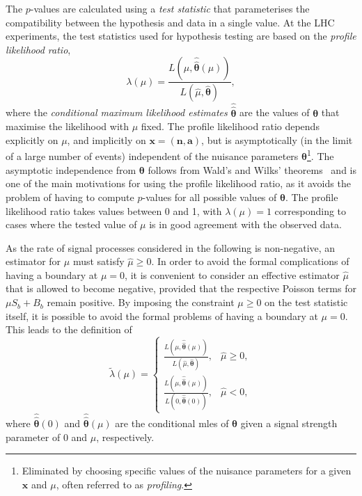 The $p$-values are calculated using a \textit{test statistic} that parameterises the compatibility between the hypothesis and data in a single value. At the LHC experiments, the test statistics used for hypothesis testing are based on the \textit{profile likelihood ratio},
\begin{equation}
	\lambda(\mu) = \frac{L(\mu,\boldsymbol{\hat{\hat{\theta}}}(\mu))}{L(\hat{\mu},\hat{\boldsymbol{\theta}})},
\end{equation}
where the \textit{conditional maximum likelihood estimates} $\boldsymbol{\hat{\hat{\theta}}}$ are the values of $\boldsymbol{\theta}$ that maximise the likelihood with $\mu$ fixed. The profile likelihood ratio depends explicitly on $\mu$, and implicitly on $\boldsymbol{x} = (\boldsymbol{n},\boldsymbol{a})$, but is asymptotically  (\ie in the limit of a large number of events) independent of the nuisance parameters $\boldsymbol{\theta}$\footnote{Eliminated by choosing specific values of the nuisance parameters for a given $\boldsymbol{x}$ and $\mu$, often referred to as \textit{profiling}.}. The asymptotic independence from $\boldsymbol{\theta}$ follows from Wald's and Wilks' theorems~\cite{wald10.2307/1990256,wilks1938} and is one of the main motivations for using the profile likelihood ratio, as it avoids the problem of having to compute $p$-values for all possible values of $\boldsymbol{\theta}$. The profile likelihood ratio takes values between 0 and 1, with $\lambda(\mu) = 1$ corresponding to cases where the tested value of $\mu$ is in good agreement with the observed data.

As the rate of signal processes considered in the following is non-negative, an estimator for $\mu$ must satisfy $\hat{\mu}\geq 0$. In order to avoid the formal complications of having a boundary at $\mu = 0$, it is convenient to consider an effective estimator $\hat{\mu}$ that is allowed to become negative, provided that the respective Poisson terms for $\mu S_b + B_b$ remain positive. By imposing the constraint $\mu \geq 0$ on the test statistic itself, it is possible to avoid the formal problems of having a boundary at $\mu = 0$. This leads to the definition of
\begin{equation}
	\tilde{\lambda}(\mu)= 
\begin{cases}
     \frac{L(\mu,\boldsymbol{\hat{\hat{\theta}}}(\mu))}{L(\hat{\mu},\hat{\boldsymbol{\theta}})}, & \hat{\mu} \geq 0,\\
     \frac{L(\mu,\boldsymbol{\hat{\hat{\theta}}}(\mu))}{L(0,\boldsymbol{\hat{\hat{\theta}}}(0))},              & \hat{\mu} < 0,
\end{cases}
\label{eq:lambda_tilde}
\end{equation}
where $\boldsymbol{\hat{\hat{\theta}}}(0)$ and $\boldsymbol{\hat{\hat{\theta}}}(\mu)$ are the conditional \glspl{mle} of $\boldsymbol{\theta}$ given a signal strength parameter of 0 and $\mu$, respectively. 

